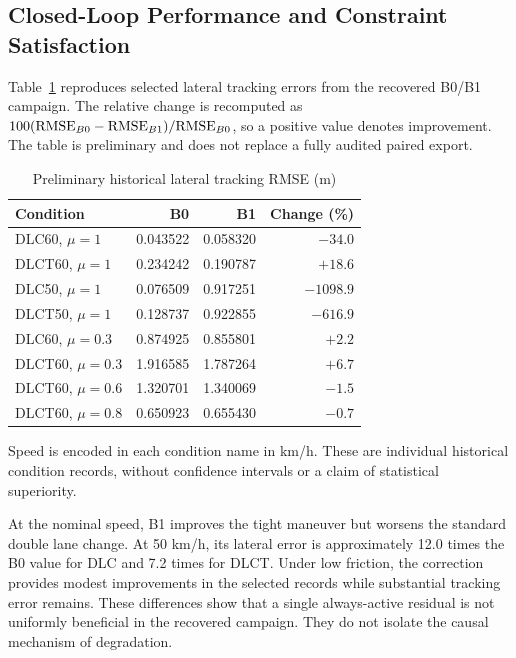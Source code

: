 \documentclass[10pt,journal]{IEEEtran}
\begin{document}
\subsection{Closed-Loop Performance and Constraint Satisfaction}
Table~\ref{tab:preliminary} reproduces selected lateral tracking errors from the recovered B0/B1 campaign. The relative change is recomputed as $100({\rm RMSE}_{B0}-{\rm RMSE}_{B1})/{\rm RMSE}_{B0}$, so a positive value denotes improvement. The table is preliminary and does not replace a fully audited paired export.
\begin{table}[!t]
\caption{Preliminary historical lateral tracking RMSE (m)}
\label{tab:preliminary}\centering\footnotesize
\begin{tabular}{@{}lrrr@{}}\toprule
Condition & B0 & B1 & Change (\%)\\\midrule
DLC60, $\mu=1$ & 0.043522 & 0.058320 & $-34.0$\\
DLCT60, $\mu=1$ & 0.234242 & 0.190787 & $+18.6$\\
DLC50, $\mu=1$ & 0.076509 & 0.917251 & $-1098.9$\\
DLCT50, $\mu=1$ & 0.128737 & 0.922855 & $-616.9$\\
DLC60, $\mu=0.3$ & 0.874925 & 0.855801 & $+2.2$\\
DLCT60, $\mu=0.3$ & 1.916585 & 1.787264 & $+6.7$\\
DLCT60, $\mu=0.6$ & 1.320701 & 1.340069 & $-1.5$\\
DLCT60, $\mu=0.8$ & 0.650923 & 0.655430 & $-0.7$\\\bottomrule
\end{tabular}
\par\smallskip
\parbox{\columnwidth}{\footnotesize Speed is encoded in each condition name in km/h. These are individual historical condition records, without confidence intervals or a claim of statistical superiority.}
\end{table}

At the nominal speed, B1 improves the tight maneuver but worsens the standard double lane change. At 50 km/h, its lateral error is approximately 12.0 times the B0 value for DLC and 7.2 times for DLCT. Under low friction, the correction provides modest improvements in the selected records while substantial tracking error remains. These differences show that a single always-active residual is not uniformly beneficial in the recovered campaign. They do not isolate the causal mechanism of degradation.
\end{document}
